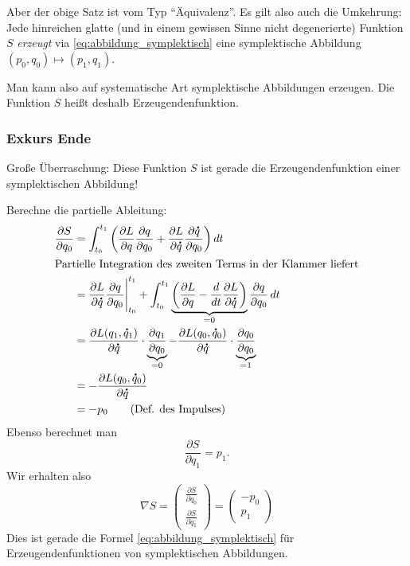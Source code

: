Aber der obige Satz ist vom Typ \enquote{Äquivalenz}. Es gilt also auch die Umkehrung: Jede hinreichen glatte (und in einem gewissen Sinne nicht degenerierte) Funktion $S$ \emph{erzeugt} via \eqref{eq:abbildung_symplektisch} eine symplektische Abbildung $(p_0,q_0)\mapsto (p_1,q_1)$.

Man kann also auf systematische Art symplektische Abbildungen erzeugen. Die Funktion $S$ heißt deshalb Erzeugendenfunktion.

\subsubsection*{Exkurs Ende}

Große Überraschung: Diese Funktion $S$ ist gerade die Erzeugendenfunktion einer symplektischen Abbildung!

Berechne die partielle Ableitung:
\begin{align*}
	\frac{\partial S}{\partial q_0}
	& =
	\int_{t_0}^{t_1} \bigg( \frac{\partial L}{\partial q} \frac{\partial q}{\partial q_0} + \frac{\partial L}{\partial \dot q}\frac{\partial\dot q}{\partial q_0}\bigg)\,dt \\
	\intertext{Partielle Integration des zweiten Terms in der Klammer liefert}
	&=
	\frac{\partial L}{\partial \dot q}\frac{\partial q}{\partial q_0}\Bigg\vert_{t_0}^{t_1} + \int_{t_0}^{t_1} \underbrace{\bigg( \frac{\partial L}{\partial q}  - \frac{d}{dt} \frac{\partial L}{\partial \dot q}\bigg)}_{=0} \frac{\partial q}{\partial q_0}\,dt \\
	&= \frac{\partial L(q_1,\dot q_1)}{\partial \dot q} \cdot \underbrace{\frac{\partial q_1}{\partial q_0}}_{=0}  - \frac{\partial L(q_0,\dot q_0)}{\partial \dot q} \cdot \underbrace{\frac{\partial q_0}{\partial q_0}}_{=1}  \\
	&= - \frac{\partial L(q_0,\dot q_0)}{\partial \dot q} \\
	&= -p_0 \tag{Def. des Impulses}
\end{align*}
Ebenso berechnet man
\begin{equation*}
	\frac{\partial S}{\partial q_1} = p_1.
\end{equation*}
Wir erhalten also
\begin{equation}
	\nabla S =
	\begin{pmatrix}
	\frac{\partial S}{\partial q_0}  \\
	\frac{\partial S}{\partial q_1}
	\end{pmatrix}
	=
	\begin{pmatrix}
	-p_0 \\ p_1
	\end{pmatrix}
\end{equation}
Dies ist gerade die Formel \eqref{eq:abbildung_symplektisch} für Erzeugendenfunktionen von symplektischen Abbildungen.

